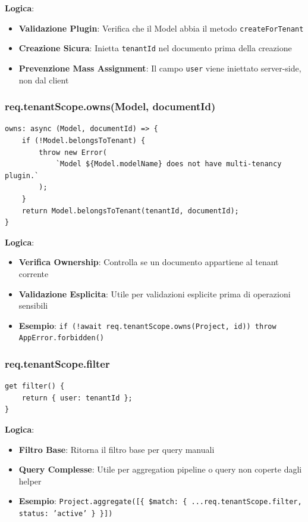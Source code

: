 \documentclass[11pt,a4paper]{article}
\begin{document}
\textbf{Logica}:
\begin{itemize}
    \item \textbf{Validazione Plugin}: Verifica che il Model abbia il metodo \texttt{createForTenant}
    \item \textbf{Creazione Sicura}: Inietta \texttt{tenantId} nel documento prima della creazione
    \item \textbf{Prevenzione Mass Assignment}: Il campo \texttt{user} viene iniettato server-side, non dal client
\end{itemize}

\subsubsection{req.tenantScope.owns(Model, documentId)}

\begin{lstlisting}
owns: async (Model, documentId) => {
    if (!Model.belongsToTenant) {
        throw new Error(
            `Model ${Model.modelName} does not have multi-tenancy plugin.`
        );
    }
    return Model.belongsToTenant(tenantId, documentId);
}
\end{lstlisting}

\textbf{Logica}:
\begin{itemize}
    \item \textbf{Verifica Ownership}: Controlla se un documento appartiene al tenant corrente
    \item \textbf{Validazione Esplicita}: Utile per validazioni esplicite prima di operazioni sensibili
    \item \textbf{Esempio}: \texttt{if (!await req.tenantScope.owns(Project, id)) throw AppError.forbidden()}
\end{itemize}

\subsubsection{req.tenantScope.filter}

\begin{lstlisting}
get filter() {
    return { user: tenantId };
}
\end{lstlisting}

\textbf{Logica}:
\begin{itemize}
    \item \textbf{Filtro Base}: Ritorna il filtro base per query manuali
    \item \textbf{Query Complesse}: Utile per aggregation pipeline o query non coperte dagli helper
    \item \textbf{Esempio}: \texttt{Project.aggregate([\{ \$match: \{ ...req.tenantScope.filter, status: 'active' \} \}])}
\end{itemize}
\end{document}
